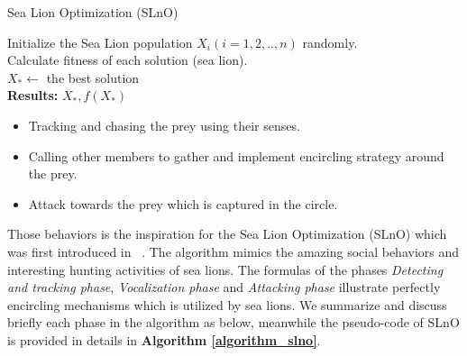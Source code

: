 \documentclass[a4paper,13pt,2p]{report}
\begin{document}
\begin{algorithm}[!t]
\caption{Sea Lion Optimization (SLnO)}
\label{algorithm_slno}
\SetAlgoLined
 Initialize the Sea Lion population $X_i (i=1,2,.., n)$ randomly. \\
 Calculate fitness of each solution (sea lion). \\
 $X_*\gets$ the best solution \\
 \textbf{Results:}  $X_*, f(X_*)$
\end{algorithm}
	
\begin{itemize}
\item Tracking and chasing the prey using their senses.
\item Calling other members to gather and implement encircling strategy around the prey.
\item Attack towards the prey which is captured in the circle.
\end{itemize}

	Those behaviors is the inspiration for the Sea Lion Optimization (SLnO) which was first introduced in ~\cite{masadeh2019sea}. The algorithm mimics the amazing social behaviors and interesting hunting activities of sea lions. The formulas of the phases \textit{Detecting and tracking phase}, \textit{Vocalization phase} and \textit{Attacking phase} illustrate perfectly encircling mechanisms which is utilized by sea lions. We summarize and discuss briefly each phase in the algorithm as below, meanwhile the pseudo-code of SLnO is provided in details in \textbf{Algorithm \ref{algorithm_slno}}.
\end{document}
